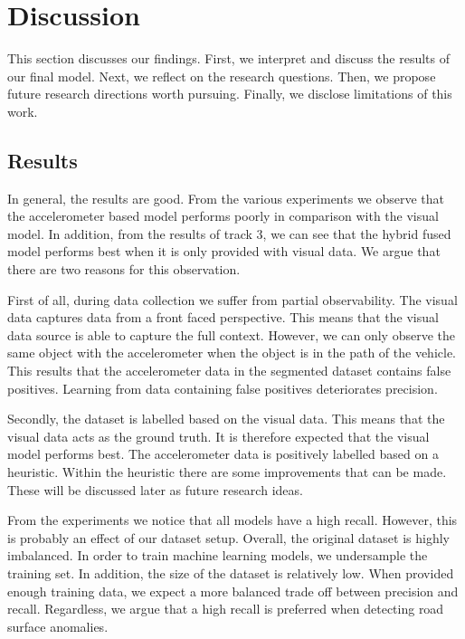 \clearpage
\section{Discussion}
\label{sec:discussion}

This section discusses our findings. First, we interpret and discuss the results of our final model. Next, we reflect on the research questions. Then, we propose future research directions worth pursuing. Finally, we disclose limitations of this work.

\subsection{Results}

In general, the results are good. From the various experiments we observe that the accelerometer based model performs poorly in comparison with the visual model. In addition, from the results of track 3, we can see that the hybrid fused model performs best when it is only provided with visual data. We argue that there are two reasons for this observation.

First of all, during data collection we suffer from partial observability. The visual data captures data from a front faced perspective. This means that the visual data source is able to capture the full context. However, we can only observe the same object with the accelerometer when the object is in the path of the vehicle. This results that the accelerometer data in the segmented dataset contains false positives. Learning from data containing false positives deteriorates precision.

Secondly, the dataset is labelled based on the visual data. This means that the visual data acts as the ground truth. It is therefore expected that the visual model performs best. The accelerometer data is positively labelled based on a heuristic. Within the heuristic there are some improvements that can be made. These will be discussed later as future research ideas.

From the experiments we notice that all models have a high recall. However, this is probably an effect of our dataset setup. Overall, the original dataset is highly imbalanced. In order to train machine learning models, we undersample the training set. In addition, the size of the dataset is relatively low. When provided enough training data, we expect a more balanced trade off between precision and recall. Regardless, we argue that a high recall is preferred when detecting road surface anomalies.


